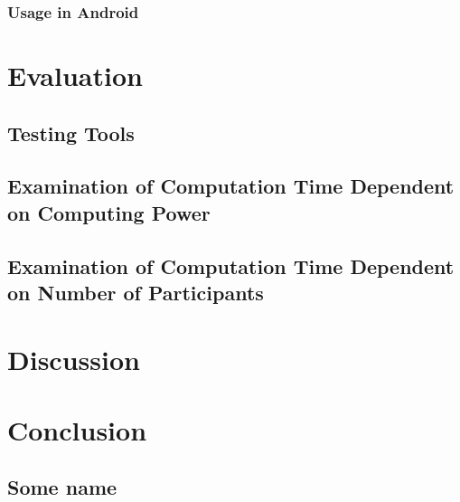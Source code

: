 		\subsection*{Usage in Android}
		
\chapter{Evaluation }

	\section{Testing Tools}
	

	\section{Examination of Computation Time Dependent on Computing Power}
	
	\section{Examination of Computation Time Dependent on Number of Participants}
	
		

\chapter{Discussion  }

\chapter{Conclusion }

\clearpage
\renewcommand{\bibname}{References} %
\printbibliography[heading=bibintoc] %

\begin{appendices}
	\chapter{Some name}
	\lipsum[3]
\end{appendices}

